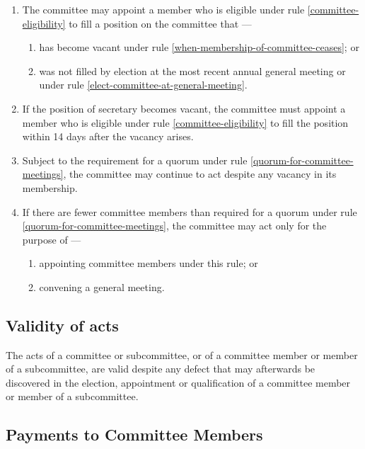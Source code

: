\documentclass[../constitution.tex]{subfiles}
\begin{document}
\begin{enumerate}

  \item The committee may appoint a member who is eligible under rule \ref{committee-eligibility} to fill a position on the committee that ---

        \begin{enumerate}

          \item has become vacant under rule \ref{when-membership-of-committee-ceases}; or
          \item was not filled by election at the most recent annual general meeting or under rule \ref{elect-committee-at-general-meeting}.
        \end{enumerate}
  \item If the position of secretary becomes vacant, the committee must appoint a member who is eligible under rule \ref{committee-eligibility} to fill the position within 14 days after the vacancy arises.
  \item Subject to the requirement for a quorum under rule \ref{quorum-for-committee-meetings}, the committee may continue to act despite any vacancy in its membership.
  \item If there are fewer committee members than required for a quorum under rule \ref{quorum-for-committee-meetings}, the committee may act only for the purpose of --- \label{committee-doesnt-meet-quorum}

        \begin{enumerate}
          \item appointing committee members under this rule; or
          \item convening a general meeting.
        \end{enumerate}
\end{enumerate}

\hypertarget{validity-of-acts}{%
  \subsection{Validity of acts}\label{validity-of-acts}}

The acts of a committee or subcommittee, or of a committee member or member of a subcommittee, are valid despite any defect that may afterwards be discovered in the election, appointment or qualification of a committee member or member of a subcommittee.

\hypertarget{payments-to-committee-members}{%
  \subsection{Payments to Committee Members}\label{payments-to-committee-members}}
\end{document}
